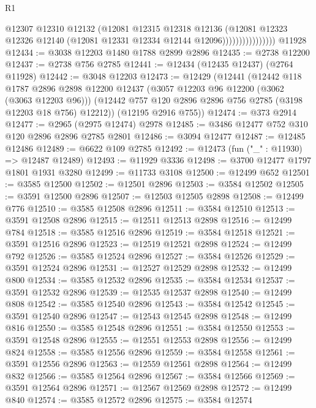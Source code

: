 \begin{lexlean}{R1}
\begin{coremodule}
                              @12307
                              @12310
                              @12132
                              (@12081
                                @12315
                                @12318
                                @12136
                                (@12081
                                  @12323
                                  @12326
                                  @12140
                                  (@12081 @12331 @12334 @12144 @12096))))))))))))))))
    @11928
@12434 := @3038 @12203 @1480 @1788 @2899 @2896
@12435 := @2738 @12200
@12437 := @2738 @756 @2785
@12441 := @12434 (@12435 @12437) (@2764 @11928)
@12442 := @3048 @12203
@12473 := @12429
    (@12441
      (@12442
        @118
        @1787
        @2896
        @2898
        @12200
        @12437
        (@3057 @12203 @96 @12200 (@3062 (@3063 @12203 @96)))
        (@12442 @757 @120 @2896 @2896 @756 @2785 (@3198 @12203 @18 @756) @12212))
      (@12195 @2916 @755))
@12474 := @373 @2914
@12477 := @2965 (@2975 @12474) @2978
@12485 := @3486 @12477 @752 @310 @120 @2896 @2896 @2785 @2801
@12486 := @3094 @12477
@12487 := @12485 @12486
@12489 := @6622 @109 @2785
@12492 := @12473 (fun ("_" : @11930) => @12487 @12489)
@12493 := @11929 @3336
@12498 := @3700 @12477 @1797 @1801 @1931 @3280
@12499 := @11733 @3108
@12500 := @12499 @652
@12501 := @3585 @12500
@12502 := @12501 @2896
@12503 := @3584 @12502
@12505 := @3591 @12500 @2896
@12507 := @12503 @12505 @2898
@12508 := @12499 @776
@12510 := @3585 @12508 @2896
@12511 := @3584 @12510
@12513 := @3591 @12508 @2896
@12515 := @12511 @12513 @2898
@12516 := @12499 @784
@12518 := @3585 @12516 @2896
@12519 := @3584 @12518
@12521 := @3591 @12516 @2896
@12523 := @12519 @12521 @2898
@12524 := @12499 @792
@12526 := @3585 @12524 @2896
@12527 := @3584 @12526
@12529 := @3591 @12524 @2896
@12531 := @12527 @12529 @2898
@12532 := @12499 @800
@12534 := @3585 @12532 @2896
@12535 := @3584 @12534
@12537 := @3591 @12532 @2896
@12539 := @12535 @12537 @2898
@12540 := @12499 @808
@12542 := @3585 @12540 @2896
@12543 := @3584 @12542
@12545 := @3591 @12540 @2896
@12547 := @12543 @12545 @2898
@12548 := @12499 @816
@12550 := @3585 @12548 @2896
@12551 := @3584 @12550
@12553 := @3591 @12548 @2896
@12555 := @12551 @12553 @2898
@12556 := @12499 @824
@12558 := @3585 @12556 @2896
@12559 := @3584 @12558
@12561 := @3591 @12556 @2896
@12563 := @12559 @12561 @2898
@12564 := @12499 @832
@12566 := @3585 @12564 @2896
@12567 := @3584 @12566
@12569 := @3591 @12564 @2896
@12571 := @12567 @12569 @2898
@12572 := @12499 @840
@12574 := @3585 @12572 @2896
@12575 := @3584 @12574

\end{coremodule}
\end{lexlean}
